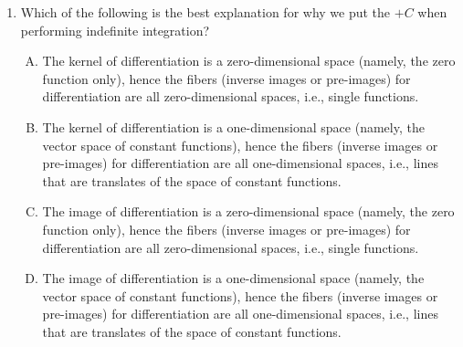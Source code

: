 \documentclass[10pt]{amsart}
\begin{document}
\begin{enumerate}
  $$f \mapsto \sum_{k=0}^\infty \frac{f^{(k)}(0)}{k!}x^k$$

  What can we say about the kernel of this linear transformation?

  \begin{enumerate}[(A)]
  \item The kernel is the set of functions $f$ satisfying $f(0) = 0$
  \item The kernel is the set of functions $f$ satisfying $f'(0) = 0$
  \item The kernel is the set of functions $f$ such that $f$ and all
    its derivatives take the value $0$ at $0$.
  \item The kernel is the set of polynomial functions.
  \item The kernel is the set of functions that have globally
    convergent power series.
  \end{enumerate}

  {\em Answer}: Option (C)

  {\em Explanation}: This is direct from the definition.

  {\em Performance review}: 18 out of 25 got this. 4 chose (B), 2
  chose (E), 1 chose (A).

  {\em Historical note (last time)}: $5$ out of $26$ got this. $10$ chose (B),
  $9$ chose (A), $1$ each chose (D) and (E).

\item Which of the following is the best explanation for why we put
  the $+C$ when performing indefinite integration?

  \begin{enumerate}[(A)]
  \item The kernel of differentiation is a zero-dimensional space
    (namely, the zero function only), hence the fibers (inverse images
    or pre-images) for differentiation are all zero-dimensional spaces,
    i.e., single functions.
  \item The kernel of differentiation is a one-dimensional space
    (namely, the vector space of constant functions), hence the fibers
    (inverse images or pre-images) for differentiation are all
    one-dimensional spaces, i.e., lines that are translates of the
    space of constant functions.
  \item The image of differentiation is a zero-dimensional space
    (namely, the zero function only), hence the fibers (inverse images
    or pre-images) for differentiation are all zero-dimensional spaces,
    i.e., single functions.
  \item The image of differentiation is a one-dimensional space
    (namely, the vector space of constant functions), hence the fibers
    (inverse images or pre-images) for differentiation are all
    one-dimensional spaces, i.e., lines that are translates of the
    space of constant functions.
  \end{enumerate}


\end{enumerate}
\end{document}
